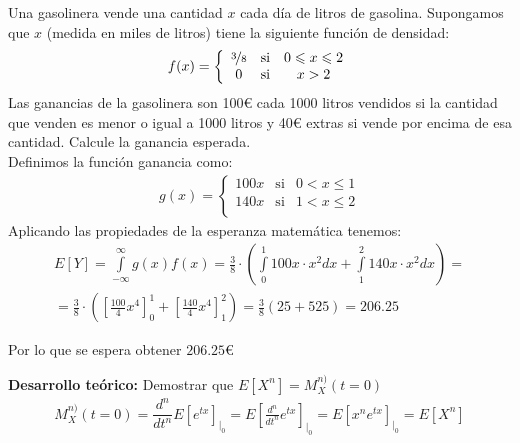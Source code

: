 \begin{ejercicio} Una gasolinera vende una cantidad $x$ cada día de litros de gasolina. Supongamos que $x$ (medida en miles de litros) tiene la siguiente función de densidad:
    \begin{gather*}
        f(x)=\left\{
        \begin{array}{ccc}
            \nicefrac{3}{8} & \text{si} & 0 \leq x \leq 2\\
            0 & \text{si} & x > 2
        \end{array}
        \right.
    \end{gather*}
    Las ganancias de la gasolinera son 100€ cada 1000 litros vendidos si la cantidad que venden es menor o igual a 1000 litros y 40€ extras si vende por encima de esa cantidad. Calcule la ganancia esperada.\\

    Definimos la función ganancia como:
    \begin{gather*}
        g(x)=\left\{
        \begin{array}{ccc}
            100x & \text{si} & 0 < x \leq 1\\
            140x & \text{si} & 1 < x \leq 2\\
        \end{array}
        \right.
    \end{gather*}
    Aplicando las propiedades de la esperanza matemática tenemos:
    \begin{gather*}
        E[Y] = \int\limits_{-\infty}^{\infty} g(x)f(x) = \frac{3}{8} \cdot \left(\int\limits_{0}^1 100x \cdot x^2 dx + \int\limits_1^2 140x \cdot x^2 dx \right) =\\
        = \frac{3}{8} \cdot \left(\left[\frac{100}{4}x^4\right]_0^1 + \left[\frac{140}{4}x^4\right]_1^2\right) = \frac{3}{8} (25 + 525) = 206.25
    \end{gather*}

    Por lo que se espera obtener $206.25$€
\end{ejercicio}

\newpage

\textbf{Desarrollo teórico:} Demostrar que $E[X^n] = M_X^{n)}(t=0)$
\begin{gather*}
    M_X^{n)}(t=0) = \dfrac{d^n}{dt^n} E\left[e^{tx}\right]_{|_0} = E\left[\frac{d^n}{dt^n} e^{tx}\right]_{|_0} = E\left[ x^n e^{tx}\right]_{|_0} = E\left[X^n\right]
\end{gather*}

